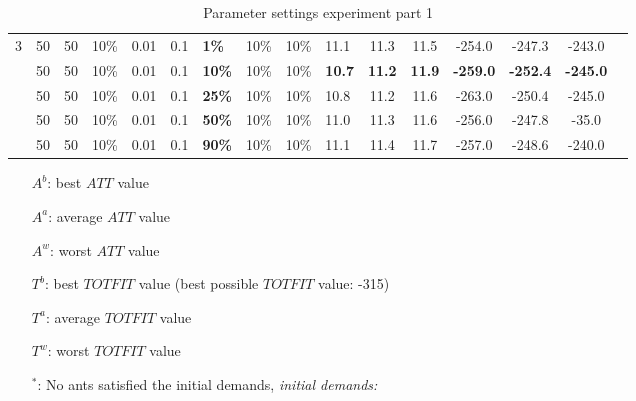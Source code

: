\begin{sidewaystable}
\begin{tabular}{|l|l|l|l|l|l|l|l|l|l||c|c|c|c|c|c|}
    \hline
    3 & 50 & 50 & 10\% & 0.01 & 0.1 & \textbf{1\%} & 10\% & 10\% & 11.1 & 11.3 & 11.5 & -254.0 & -247.3 & -243.0 \\
    ~ & 50 & 50 & 10\% & 0.01 & 0.1 & \textbf{10\%} & 10\% & 10\% & \textbf{10.7} & \textbf{11.2} & \textbf{11.9} & \textbf{-259.0} & \textbf{-252.4} & \textbf{-245.0} \\
    ~ & 50 & 50 & 10\% & 0.01 & 0.1 & \textbf{25\%} & 10\% & 10\% & 10.8 & 11.2 & 11.6 & -263.0 & -250.4 & -245.0 \\
    ~ & 50 & 50 & 10\% & 0.01 & 0.1 & \textbf{50\%} & 10\% & 10\% & 11.0 & 11.3 & 11.6 & -256.0 & -247.8 & -35.0 \\
    ~ & 50 & 50 & 10\% & 0.01 & 0.1 & \textbf{90\%} & 10\% & 10\% & 11.1 & 11.4 & 11.7 & -257.0 & -248.6 & -240.0 \\
    \hline
    \end{tabular}
    \caption {Parameter settings experiment part 1}
    \tiny
    \begin{itemize}[noitemsep]
    \item[$A^b$:] best $ATT$ value
    \item[$A^a$:] average $ATT$ value
    \item[$A^w$:] worst $ATT$ value
    \item[$T^b$:] best $TOTFIT$ value (best possible $TOTFIT$ value: -315)
    \item[$T^a$:] average $TOTFIT$ value
    \item[$T^w$:] worst $TOTFIT$ value
    \item[$^*$:] No ants satisfied the initial demands, \emph{\color{red} initial demands: }
    \end{itemize}
    \label{table:pm1}
\end{sidewaystable}

